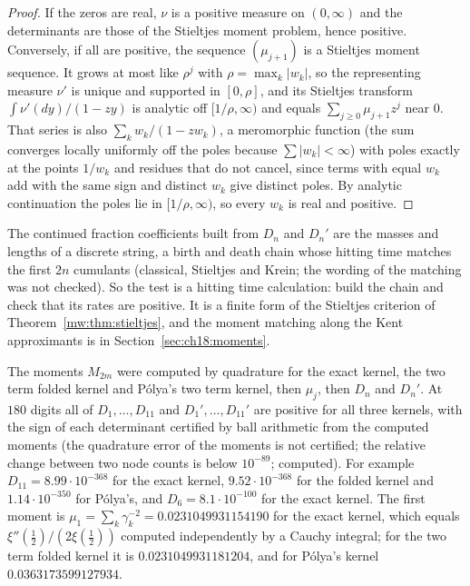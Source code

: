 \begin{proof}
If the zeros are real, $\nu$ is a positive measure on $(0,\infty)$ and the determinants are those of the Stieltjes moment problem, hence positive. Conversely, if all are positive, the sequence $(\mu_{j+1})$ is a Stieltjes moment sequence. It grows at most like $\rho^j$ with $\rho=\max_k|w_k|$, so the representing measure $\nu'$ is unique and supported in $[0,\rho]$, and its Stieltjes transform $\int\nu'(dy)/(1-zy)$ is analytic off $[1/\rho,\infty)$ and equals $\sum_{j\ge0}\mu_{j+1}z^j$ near $0$. That series is also $\sum_kw_k/(1-zw_k)$, a meromorphic function (the sum converges locally uniformly off the poles because $\sum|w_k|<\infty$) with poles exactly at the points $1/w_k$ and residues that do not cancel, since terms with equal $w_k$ add with the same sign and distinct $w_k$ give distinct poles. By analytic continuation the poles lie in $[1/\rho,\infty)$, so every $w_k$ is real and positive.
\end{proof}

The continued fraction coefficients built from $D_n$ and $D_n'$ are the masses and lengths of a discrete string, a birth and death chain whose hitting time matches the first $2n$ cumulants (classical, Stieltjes and Krein; the wording of the matching was not checked). %
So the test is a hitting time calculation: build the chain and check that its rates are positive. It is a finite form of the Stieltjes criterion of Theorem~\ref{mw:thm:stieltjes}, and the moment matching along the Kent approximants is in Section~\ref{sec:ch18:moments}.

The moments $M_{2m}$ were computed by quadrature for the exact kernel, the two term folded kernel and P\'olya's two term kernel, then $\mu_j$, then $D_n$ and $D_n'$. At $180$ digits all of $D_1,\ldots,D_{11}$ and $D_1',\ldots,D_{11}'$ are positive for all three kernels, with the sign of each determinant certified by ball arithmetic from the computed moments (the quadrature error of the moments is not certified; the relative change between two node counts is below $10^{-89}$; computed). For example $D_{11}=8.99\cdot10^{-368}$ for the exact kernel, $9.52\cdot10^{-368}$ for the folded kernel and $1.14\cdot10^{-350}$ for P\'olya's, and $D_6=8.1\cdot10^{-100}$ for the exact kernel. The first moment is $\mu_1=\sum_k\gamma_k^{-2}=0.0231049931154190$ for the exact kernel, which equals $\xi''(\tfrac12)/(2\xi(\tfrac12))$ computed independently by a Cauchy integral; for the two term folded kernel it is $0.0231049931181204$, and for P\'olya's kernel $0.0363173599127934$.

